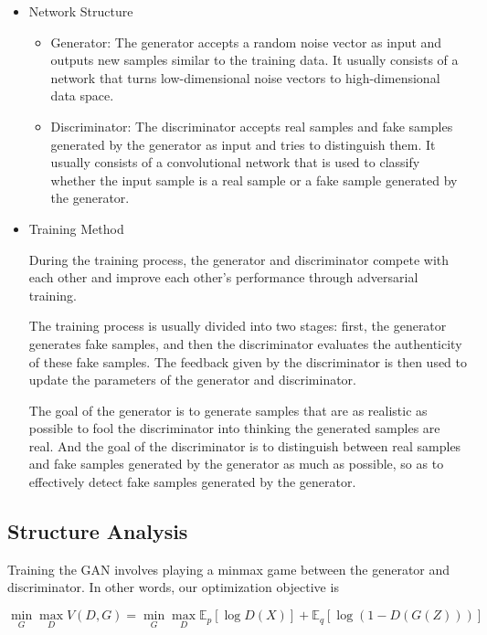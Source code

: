 \begin{itemize}
  \item {
      Network Structure
      \begin{itemize}
        \item {Generator:
            The generator accepts a random noise vector as input and outputs new samples similar to the training data.
            It usually consists of a network that turns low-dimensional noise vectors to high-dimensional data space.
          }
        \item {Discriminator:
            The discriminator accepts real samples and fake samples generated by the generator as input and tries to distinguish them.
            It usually consists of a convolutional network that is used to classify whether the input sample is a real sample or a fake sample generated by the generator.
          }
      \end{itemize}
    }
  \item {
      Training Method

      During the training process, the generator and discriminator compete with each other and improve each other's performance through adversarial training.

      The training process is usually divided into two stages: first, the generator generates fake samples, and then the discriminator evaluates the authenticity of these fake samples.
      The feedback given by the discriminator is then used to update the parameters of the generator and discriminator.

      The goal of the generator is to generate samples that are as realistic as possible to fool the discriminator into thinking the generated samples are real.
      And the goal of the discriminator is to distinguish between real samples and fake samples generated by the generator as much as possible, so as to effectively detect fake samples generated by the generator.
    }
\end{itemize}

\subsection{Structure Analysis}

Training the GAN involves playing a minmax game between the generator and discriminator.
In other words, our optimization objective is

\begin{equation}
  \min\limits_{G} \max\limits_{D}V(D,G)=
  \min\limits_{G} \max\limits_{D}\mathbb{E}_{p}[\log{D(X)}] + \mathbb{E}_{q}[\log{(1-D(G(Z)))}]
\end{equation}


